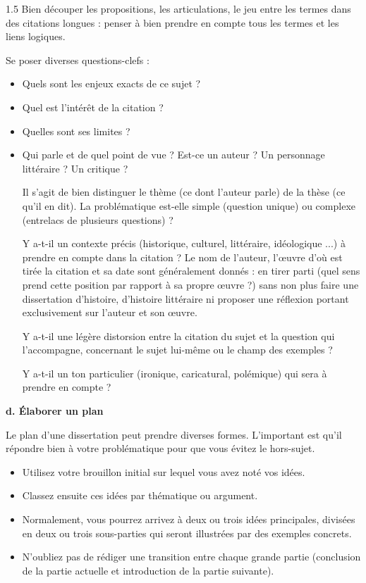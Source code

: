 \documentclass[12pt]{article}
\begin{document}
\begin{spacing}{1.5}
 Bien découper les propositions, les articulations, le jeu entre les termes dans des 
citations longues : penser à bien prendre en compte tous les termes et les liens logiques.


 Se poser diverses questions-clefs :
 
 \begin{itemize}
 \item Quels sont les enjeux exacts de ce sujet ?
 \item Quel est l'intérêt de la citation ?
 \item Quelles sont ses limites ?
 \item Qui parle et de quel point de vue ? Est-ce un auteur ? Un personnage littéraire ? Un critique ?
 
 Il s'agit de bien distinguer le thème (ce dont l'auteur parle) de la thèse (ce qu'il en dit).
 La problématique est-elle simple (question unique) ou complexe (entrelacs de 
plusieurs questions) ?
 
 Y a-t-il un contexte précis (historique, culturel, littéraire, idéologique $...$) à prendre en compte dans la citation ? Le nom de l'auteur, l'œuvre d'où est tirée la citation et sa date 
sont généralement donnés : en tirer parti (quel sens prend cette position par rapport à 
sa propre œuvre ?) sans non plus faire une dissertation d'histoire, d'histoire littéraire ni proposer une réflexion portant exclusivement sur l'auteur et son œuvre.
 
 Y a-t-il une légère distorsion entre la citation du sujet et la question qui l'accompagne, concernant le sujet lui-même ou le champ des exemples ?
 
 Y a-t-il un ton particulier (ironique, caricatural, polémique) qui sera à prendre en compte ?
\end{itemize}

\quad

\textbf{d.  Élaborer un plan}

Le plan d'une dissertation peut prendre diverses formes. L'important est qu'il répondre bien à votre problématique pour que vous évitez le hors-sujet.

\begin{itemize}
\item Utilisez votre brouillon initial sur lequel vous avez noté vos idées.
\item Classez ensuite ces idées par thématique ou argument.
\item Normalement, vous pourrez arrivez à deux ou trois idées principales, divisées en deux ou trois sous-parties qui seront illustrées par des exemples concrets.
\item N'oubliez pas de rédiger une transition entre chaque grande partie (conclusion de la partie actuelle et introduction de la partie suivante).
\end{itemize}


\end{spacing}
\end{document}
